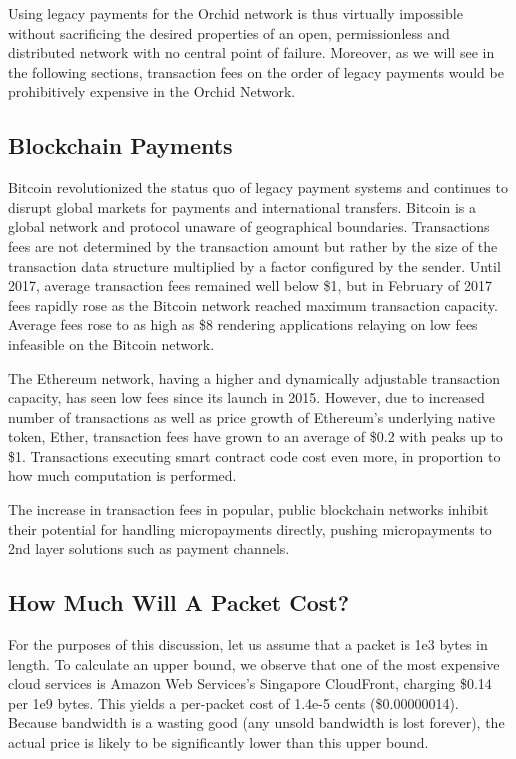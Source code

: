 Using legacy payments for the Orchid network is thus virtually impossible without sacrificing the desired properties of an open, permissionless and distributed network with no central point of failure. Moreover, as we will see in the following sections, transaction fees on the order of legacy payments would be prohibitively expensive in the Orchid Network.

\subsection{Blockchain Payments}

Bitcoin revolutionized the status quo of legacy payment systems and continues to disrupt global markets for payments and international transfers. Bitcoin is a global network and protocol unaware of geographical boundaries. Transactions fees are not determined by the transaction amount but rather by the size of the transaction data structure multiplied by a factor configured by the sender. Until 2017, average transaction fees remained well below \$1, but in February of 2017 fees rapidly rose as the Bitcoin network reached maximum transaction capacity. Average fees rose to as high as \$8\cite{BitInfoChartsBTC} rendering applications relaying on low fees infeasible on the Bitcoin network.

The Ethereum network, having a higher and dynamically adjustable transaction capacity, has seen low fees since its launch in 2015. However, due to increased number of transactions as well as price growth of Ethereum's underlying native token, Ether, transaction fees have grown to an average of \$0.2 with peaks up to \$1\cite{BitInfoChartsETH}. Transactions executing smart contract code cost even more, in proportion to how much computation is performed.

The increase in transaction fees in popular, public blockchain networks inhibit their potential for handling micropayments directly, pushing micropayments to 2nd layer solutions such as payment channels.

\subsection{How Much Will A Packet Cost?}

For the purposes of this discussion, let us assume that a packet is 1e3 bytes in length. To calculate an upper bound, we observe that one of the most expensive cloud services is Amazon Web Services's Singapore CloudFront, charging \$0.14 per 1e9 bytes. This yields a per-packet cost of 1.4e-5 cents (\$0.00000014). Because bandwidth is a wasting good (any unsold bandwidth is lost forever), the actual price is likely to be significantly lower than this upper bound.

